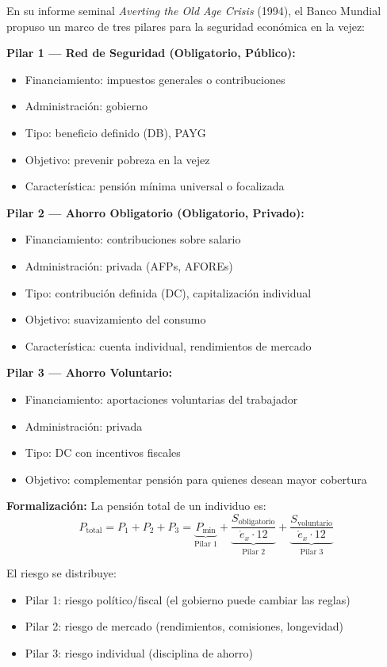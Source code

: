 \documentclass[11pt,a4paper]{report}
\begin{document}
\begin{tcolorbox}[colback=blue!5!white, colframe=blue!75!black, title=\textbf{Definici\'on Formal: Modelo Multi-Pilar}, breakable]
En su informe seminal \textit{Averting the Old Age Crisis} (1994), el Banco Mundial propuso un marco de tres pilares para la seguridad econ\'omica en la vejez:

\textbf{Pilar 1 --- Red de Seguridad (Obligatorio, P\'ublico):}
\begin{itemize}
  \item Financiamiento: impuestos generales o contribuciones
  \item Administraci\'on: gobierno
  \item Tipo: beneficio definido (DB), PAYG
  \item Objetivo: prevenir pobreza en la vejez
  \item Caracter\'istica: pensi\'on m\'inima universal o focalizada
\end{itemize}

\textbf{Pilar 2 --- Ahorro Obligatorio (Obligatorio, Privado):}
\begin{itemize}
  \item Financiamiento: contribuciones sobre salario
  \item Administraci\'on: privada (AFPs, AFOREs)
  \item Tipo: contribuci\'on definida (DC), capitalizaci\'on individual
  \item Objetivo: suavizamiento del consumo
  \item Caracter\'istica: cuenta individual, rendimientos de mercado
\end{itemize}

\textbf{Pilar 3 --- Ahorro Voluntario:}
\begin{itemize}
  \item Financiamiento: aportaciones voluntarias del trabajador
  \item Administraci\'on: privada
  \item Tipo: DC con incentivos fiscales
  \item Objetivo: complementar pensi\'on para quienes desean mayor cobertura
\end{itemize}

\textbf{Formalizaci\'on:}
La pensi\'on total de un individuo es:
\[
  P_{\text{total}} = P_1 + P_2 + P_3 = \underbrace{P_{\min}}_{\text{Pilar 1}} + \underbrace{\frac{S_{\text{obligatorio}}}{\mathring{e}_x \cdot 12}}_{\text{Pilar 2}} + \underbrace{\frac{S_{\text{voluntario}}}{\mathring{e}_x \cdot 12}}_{\text{Pilar 3}}
\]

El riesgo se distribuye:
\begin{itemize}
  \item Pilar 1: riesgo pol\'itico/fiscal (el gobierno puede cambiar las reglas)
  \item Pilar 2: riesgo de mercado (rendimientos, comisiones, longevidad)
  \item Pilar 3: riesgo individual (disciplina de ahorro)
\end{itemize}
\end{tcolorbox}
\end{document}
